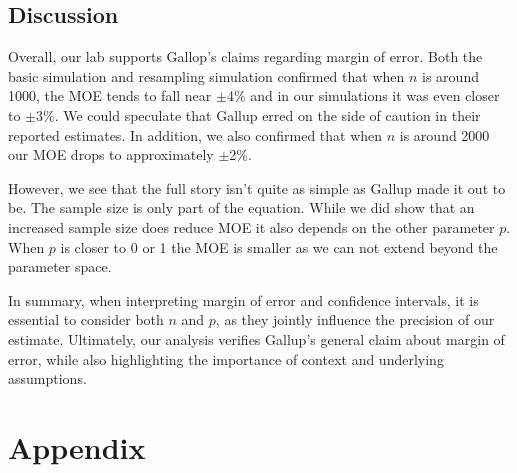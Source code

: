 \documentclass{article}\usepackage[]{graphicx}\usepackage[]{xcolor}
\begin{document}
\begin{multicols}{2}
\section{Discussion}
Overall, our lab supports Gallop's claims regarding margin of error. Both the basic simulation and resampling simulation confirmed that when $n$ is around 1000, the MOE tends to fall near $\pm$4\% and in our simulations it was even closer to $\pm$3\%. We could speculate that Gallup erred on the side of caution in their reported estimates. In addition, we also confirmed that when $n$ is around 2000 our MOE drops to approximately $\pm$2\%.

However, we see that the full story isn't quite as simple as Gallup made it out to be. The sample size is only part of the equation. While we did show that an increased sample size does reduce MOE it also depends on the other parameter $p$. When $p$ is closer to 0 or 1 the MOE is smaller as we can not extend beyond the parameter space. 

In summary, when interpreting margin of error and confidence intervals, it is essential to consider both $n$ and $p$, as they jointly influence the precision of our estimate. Ultimately, our analysis verifies Gallup's general claim about margin of error, while also highlighting the importance of context and underlying assumptions. 


\vspace{2em}


\begin{tiny}

\end{tiny}
\end{multicols}

\newpage
\onecolumn
\section{Appendix}
\end{document}
